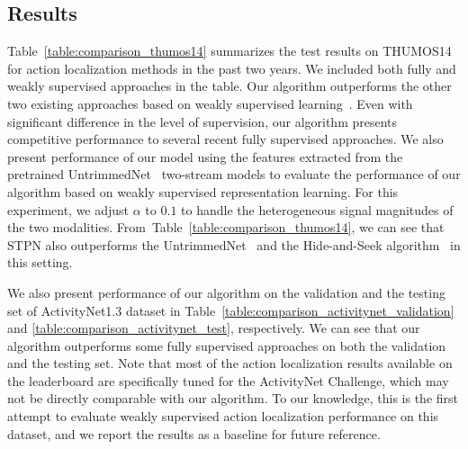 \documentclass[10pt,twocolumn,letterpaper]{article}
\begin{document}
\subsection{Results}
\label{sub:results}
Table~\ref{table:comparison_thumos14} summarizes the test results on THUMOS14 for action localization methods in the past two years.
We included both fully and weakly supervised approaches in the table.
Our algorithm outperforms the other two existing approaches based on weakly supervised learning~\cite{wang17untrimmednets,singh17hide}. 
Even with significant difference in the level of supervision, our algorithm presents competitive performance to several recent fully supervised approaches.
We also present performance of our model using the features extracted from the pretrained UntrimmedNet~\cite{wang17untrimmednets} two-stream models to evaluate the performance of our algorithm based on weakly supervised representation learning. 
For this experiment, we adjust $\alpha$ to $0.1$ to handle the heterogeneous signal magnitudes of the two modalities.
From~Table~\ref{table:comparison_thumos14}, we can see that STPN also outperforms the UntrimmedNet~\cite{wang17untrimmednets} and the Hide-and-Seek algorithm~\cite{singh17hide} in this setting.

We also present performance of our algorithm on the validation and the testing set of ActivityNet1.3 dataset in Table~\ref{table:comparison_activitynet_validation} and \ref{table:comparison_activitynet_test}, respectively.
We can see that our algorithm outperforms some fully supervised approaches on both the validation and the testing set.
Note that most of the action localization results available on the leaderboard are specifically tuned for the ActivityNet Challenge, which may not be directly comparable with our algorithm.
To our knowledge, this is the first attempt to evaluate weakly supervised action localization performance on this dataset, and we report the results as a baseline for future reference.
\end{document}
